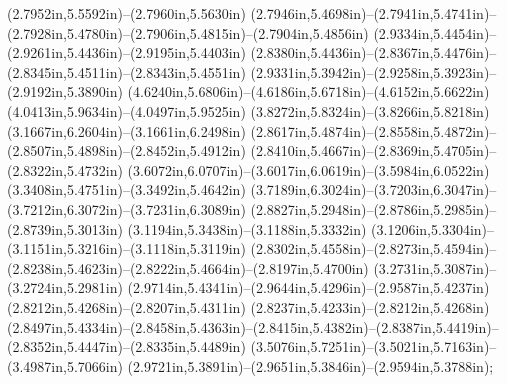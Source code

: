 (2.7952in,5.5592in)--(2.7960in,5.5630in) (2.7946in,5.4698in)--(2.7941in,5.4741in)--(2.7928in,5.4780in)--(2.7906in,5.4815in)--(2.7904in,5.4856in) (2.9334in,5.4454in)--(2.9261in,5.4436in)--(2.9195in,5.4403in) (2.8380in,5.4436in)--(2.8367in,5.4476in)--(2.8345in,5.4511in)--(2.8343in,5.4551in) (2.9331in,5.3942in)--(2.9258in,5.3923in)--(2.9192in,5.3890in) (4.6240in,5.6806in)--(4.6186in,5.6718in)--(4.6152in,5.6622in) (4.0413in,5.9634in)--(4.0497in,5.9525in) (3.8272in,5.8324in)--(3.8266in,5.8218in) (3.1667in,6.2604in)--(3.1661in,6.2498in) (2.8617in,5.4874in)--(2.8558in,5.4872in)--(2.8507in,5.4898in)--(2.8452in,5.4912in) (2.8410in,5.4667in)--(2.8369in,5.4705in)--(2.8322in,5.4732in) (3.6072in,6.0707in)--(3.6017in,6.0619in)--(3.5984in,6.0522in) (3.3408in,5.4751in)--(3.3492in,5.4642in) (3.7189in,6.3024in)--(3.7203in,6.3047in)--(3.7212in,6.3072in)--(3.7231in,6.3089in) (2.8827in,5.2948in)--(2.8786in,5.2985in)--(2.8739in,5.3013in) (3.1194in,5.3438in)--(3.1188in,5.3332in) (3.1206in,5.3304in)--(3.1151in,5.3216in)--(3.1118in,5.3119in) (2.8302in,5.4558in)--(2.8273in,5.4594in)--(2.8238in,5.4623in)--(2.8222in,5.4664in)--(2.8197in,5.4700in) (3.2731in,5.3087in)--(3.2724in,5.2981in) (2.9714in,5.4341in)--(2.9644in,5.4296in)--(2.9587in,5.4237in) (2.8212in,5.4268in)--(2.8207in,5.4311in) (2.8237in,5.4233in)--(2.8212in,5.4268in)
(2.8497in,5.4334in)--(2.8458in,5.4363in)--(2.8415in,5.4382in)--(2.8387in,5.4419in)--(2.8352in,5.4447in)--(2.8335in,5.4489in) (3.5076in,5.7251in)--(3.5021in,5.7163in)--(3.4987in,5.7066in) (2.9721in,5.3891in)--(2.9651in,5.3846in)--(2.9594in,5.3788in);
